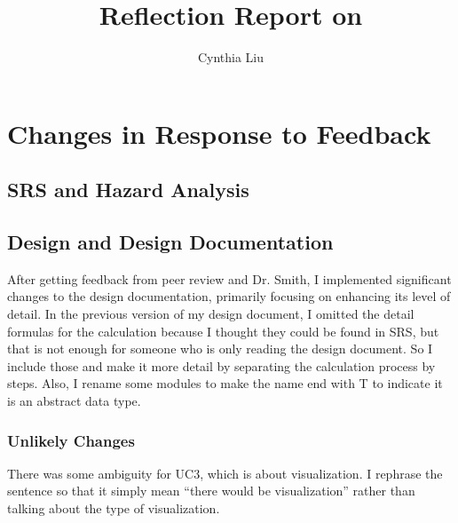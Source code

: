\documentclass{article}
\title{Reflection Report on \progname}
\author{Cynthia Liu}
\date{}
\begin{document}
\maketitle


\section{Changes in Response to Feedback}



\subsection{SRS and Hazard Analysis}

\subsection{Design and Design Documentation}
After getting feedback from peer review and Dr. Smith, I implemented significant changes to the design documentation, primarily focusing on enhancing its level of detail. In the previous version of my design document, I omitted the detail formulas for the calculation because I thought they could be found in SRS, but that is not enough for someone who is only reading the design document. So I include those and make it more detail by separating the calculation process by steps. Also, I rename some modules to make the name end with T to indicate it is an abstract data type.


\subsubsection{Unlikely Changes}
There was some ambiguity for UC3, which is about visualization. I rephrase the sentence so that it simply mean ``there would be visualization'' rather than talking about the type of visualization.
\end{document}
